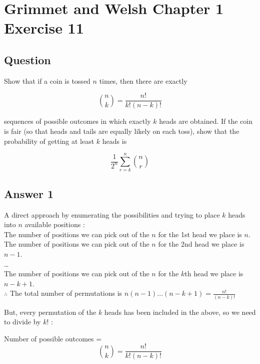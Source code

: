 \section{Grimmet and Welsh Chapter 1 Exercise 11}
\subsection{Question}

Show that if a coin is tossed $n$ times, then there are exactly
 
\begin{equation*} 
\binom{n}{k} = \frac{n!}{k!(n-k)!} 
\end{equation*}

sequences of possible outcomes in which exactly $k$ heads are obtained. 
If the coin is fair (so that heads and tails are equally likely on each toss), show that the probability of getting
at least $k$ heads is

\begin{equation*} 
\frac{1}{2^n}\sum^n_{r=k}{\binom{n}{r}} 
\end{equation*}

\subsection{Answer 1}

A direct approach by enumerating the possibilities and trying to place $k$ heads into $n$ available positions : \\
The number of positions we can pick out of the $n$ for the 1st head we place is $n$. \\
The number of positions we can pick out of the $n$ for the 2nd head we place is $n-1$. \\
\ldots \\
The number of positions we can pick out of the $n$ for the $k$th head we place is $n-k+1$. \\ 

$\therefore$ The total number of permutations is $n(n-1)\ldots(n-k+1) = \frac{n!}{(n-k)!}$

But, every permutation of the $k$ heads has been included in the above, so we need to divide by $k!$ :

Number of possible outcomes = 
\begin{equation*}
\binom{n}{k} = \frac{n!}{k!(n-k)!} 
\end{equation*}   
 

